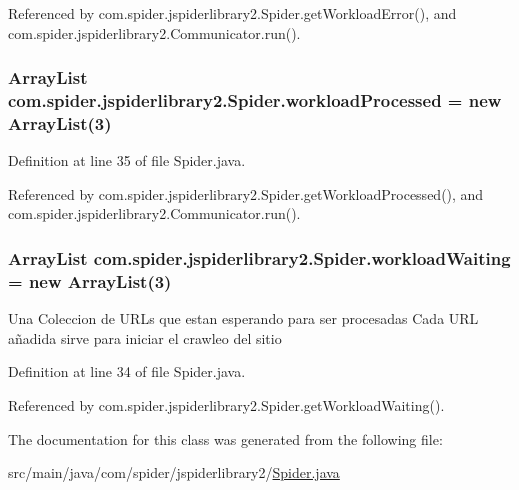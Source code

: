 \-Referenced by com.\-spider.\-jspiderlibrary2.\-Spider.\-get\-Workload\-Error(), and com.\-spider.\-jspiderlibrary2.\-Communicator.\-run().

\hypertarget{classcom_1_1spider_1_1jspiderlibrary2_1_1_spider_ad9e3dbf06a7d4a976fadc85df5fcf81e}{
\subsubsection[{workload\-Processed}]{\setlength{\rightskip}{0pt plus 5cm}\-Array\-List {\bf com.\-spider.\-jspiderlibrary2.\-Spider.\-workload\-Processed} = new \-Array\-List(3)}}\label{classcom_1_1spider_1_1jspiderlibrary2_1_1_spider_ad9e3dbf06a7d4a976fadc85df5fcf81e}


\-Definition at line 35 of file \-Spider.\-java.



\-Referenced by com.\-spider.\-jspiderlibrary2.\-Spider.\-get\-Workload\-Processed(), and com.\-spider.\-jspiderlibrary2.\-Communicator.\-run().

\hypertarget{classcom_1_1spider_1_1jspiderlibrary2_1_1_spider_a7ab086f00e291c450e31bac92b3b1f3a}{
\subsubsection[{workload\-Waiting}]{\setlength{\rightskip}{0pt plus 5cm}\-Array\-List {\bf com.\-spider.\-jspiderlibrary2.\-Spider.\-workload\-Waiting} = new \-Array\-List(3)}}\label{classcom_1_1spider_1_1jspiderlibrary2_1_1_spider_a7ab086f00e291c450e31bac92b3b1f3a}
\-Una \-Coleccion de \-U\-R\-Ls que estan esperando para ser procesadas \-Cada \-U\-R\-L añadida sirve para iniciar el crawleo del sitio 

\-Definition at line 34 of file \-Spider.\-java.



\-Referenced by com.\-spider.\-jspiderlibrary2.\-Spider.\-get\-Workload\-Waiting().



\-The documentation for this class was generated from the following file\-:\begin{DoxyCompactItemize}
\item 
src/main/java/com/spider/jspiderlibrary2/\hyperlink{_spider_8java}{\-Spider.\-java}\end{DoxyCompactItemize}
